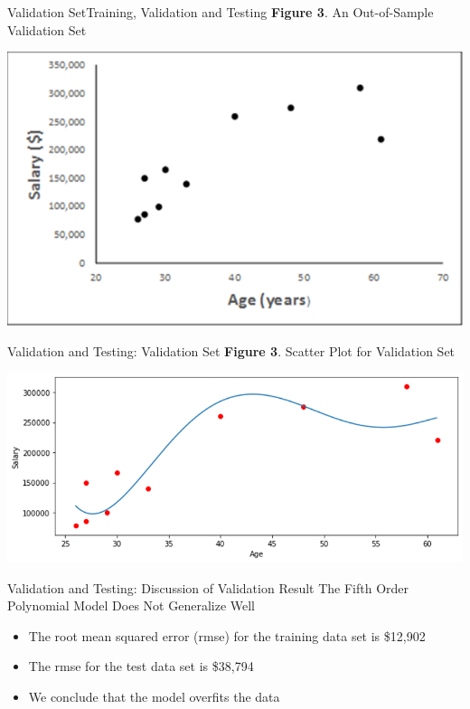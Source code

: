 \documentclass[11pt]{beamer}
\begin{document}
%
%
\begin{frame}{Validation Set}{Training, Validation and Testing}
\textbf {Figure 3}. An Out-of-Sample Validation Set
	\begin{center}
	\includegraphics[scale=.6]{../05-pictures/lesson-2-1_pic_4.png}
	\end{center}
\end{frame}
%
%
\begin{frame}{Validation and Testing: Validation Set}
\textbf{Figure 3}. Scatter Plot for Validation Set
	\begin{center}
	\includegraphics[scale=.5]{../05-pictures/lesson-2-1_pic_5.png}
	\end{center}
\end{frame}
%
%
\begin{frame} {Validation and Testing: Discussion of Validation Result}
The Fifth Order Polynomial Model Does Not Generalize Well
	\begin{itemize}
		\item The root mean squared error (rmse) for the training      data set is \$12,902
		\item  The rmse for the test data set is \$38,794
		\item   We conclude that the model overfits the data
	\end{itemize}
\end{frame}
\end{document}
